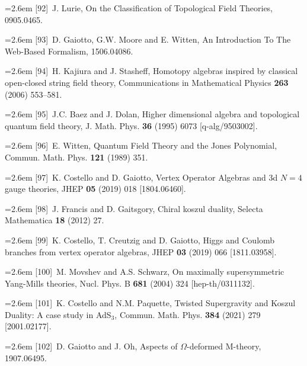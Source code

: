 \par\noindent\hangindent=2.6em [92]~J. Lurie, On the Classification of Topological Field Theories, 0905.0465.

\par\noindent\hangindent=2.6em [93]~D. Gaiotto, G.W. Moore and E. Witten, An Introduction To The Web-Based Formalism, 1506.04086.

\par\noindent\hangindent=2.6em [94]~H. Kajiura and J. Stasheff, Homotopy algebras inspired by classical open-closed string field theory, Communications in Mathematical Physics \textbf{263} (2006) 553--581.

\par\noindent\hangindent=2.6em [95]~J.C. Baez and J. Dolan, Higher dimensional algebra and topological quantum field theory, J. Math. Phys. \textbf{36} (1995) 6073 [q-alg/9503002].

\par\noindent\hangindent=2.6em [96]~E. Witten, Quantum Field Theory and the Jones Polynomial, Commun. Math. Phys. \textbf{121} (1989) 351.

\par\noindent\hangindent=2.6em [97]~K. Costello and D. Gaiotto, Vertex Operator Algebras and 3d $N=4$ gauge theories, JHEP \textbf{05} (2019) 018 [1804.06460].

\par\noindent\hangindent=2.6em [98]~J. Francis and D. Gaitsgory, Chiral koszul duality, Selecta Mathematica \textbf{18} (2012) 27.

\par\noindent\hangindent=2.6em [99]~K. Costello, T. Creutzig and D. Gaiotto, Higgs and Coulomb branches from vertex operator algebras, JHEP \textbf{03} (2019) 066 [1811.03958].

\par\noindent\hangindent=2.6em [100]~M. Movshev and A.S. Schwarz, On maximally supersymmetric Yang-Mills theories, Nucl. Phys. B \textbf{681} (2004) 324 [hep-th/0311132].

\par\noindent\hangindent=2.6em [101]~K. Costello and N.M. Paquette, Twisted Supergravity and Koszul Duality: A case study in AdS$_3$, Commun. Math. Phys. \textbf{384} (2021) 279 [2001.02177].

\par\noindent\hangindent=2.6em [102]~D. Gaiotto and J. Oh, Aspects of $\Omega$-deformed M-theory, 1907.06495.

